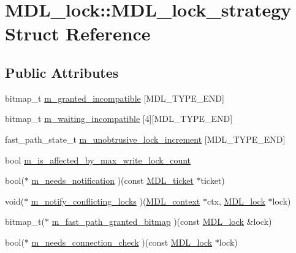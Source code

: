 \hypertarget{structMDL__lock_1_1MDL__lock__strategy}{}\section{M\+D\+L\+\_\+lock\+:\+:M\+D\+L\+\_\+lock\+\_\+strategy Struct Reference}
\label{structMDL__lock_1_1MDL__lock__strategy}
\subsection*{Public Attributes}
\begin{DoxyCompactItemize}
\item 
bitmap\+\_\+t \mbox{\hyperlink{structMDL__lock_1_1MDL__lock__strategy_adcee4cc0d160ac5a2fb2c3633b103714}{m\+\_\+granted\+\_\+incompatible}} \mbox{[}M\+D\+L\+\_\+\+T\+Y\+P\+E\+\_\+\+E\+ND\mbox{]}
\item 
bitmap\+\_\+t \mbox{\hyperlink{structMDL__lock_1_1MDL__lock__strategy_a040ce09f82f272cc3162c9eee05d45ef}{m\+\_\+waiting\+\_\+incompatible}} \mbox{[}4\mbox{]}\mbox{[}M\+D\+L\+\_\+\+T\+Y\+P\+E\+\_\+\+E\+ND\mbox{]}
\item 
fast\+\_\+path\+\_\+state\+\_\+t \mbox{\hyperlink{structMDL__lock_1_1MDL__lock__strategy_a9de2e3a39b6ce1f7b8c4f9177f84aef0}{m\+\_\+unobtrusive\+\_\+lock\+\_\+increment}} \mbox{[}M\+D\+L\+\_\+\+T\+Y\+P\+E\+\_\+\+E\+ND\mbox{]}
\item 
bool \mbox{\hyperlink{structMDL__lock_1_1MDL__lock__strategy_a25d40d952e36f4a0645a6f100efcd8c1}{m\+\_\+is\+\_\+affected\+\_\+by\+\_\+max\+\_\+write\+\_\+lock\+\_\+count}}
\item 
bool($\ast$ \mbox{\hyperlink{structMDL__lock_1_1MDL__lock__strategy_ada7f78a5cf59cf308e33bfffbb54be26}{m\+\_\+needs\+\_\+notification}} )(const \mbox{\hyperlink{classMDL__ticket}{M\+D\+L\+\_\+ticket}} $\ast$ticket)
\item 
void($\ast$ \mbox{\hyperlink{structMDL__lock_1_1MDL__lock__strategy_a1ac597d3a597367d03f5901c8001cb51}{m\+\_\+notify\+\_\+conflicting\+\_\+locks}} )(\mbox{\hyperlink{classMDL__context}{M\+D\+L\+\_\+context}} $\ast$ctx, \mbox{\hyperlink{classMDL__lock}{M\+D\+L\+\_\+lock}} $\ast$lock)
\item 
bitmap\+\_\+t($\ast$ \mbox{\hyperlink{structMDL__lock_1_1MDL__lock__strategy_a36f8689c09e695f01314f2fe57faca74}{m\+\_\+fast\+\_\+path\+\_\+granted\+\_\+bitmap}} )(const \mbox{\hyperlink{classMDL__lock}{M\+D\+L\+\_\+lock}} \&lock)
\item 
bool($\ast$ \mbox{\hyperlink{structMDL__lock_1_1MDL__lock__strategy_a03b41088020b3b6f58bf511b2c8118d1}{m\+\_\+needs\+\_\+connection\+\_\+check}} )(const \mbox{\hyperlink{classMDL__lock}{M\+D\+L\+\_\+lock}} $\ast$lock)
\end{DoxyCompactItemize}


